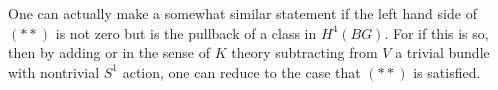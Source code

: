 One can actually make a somewhat similar statement if 
the left hand side of $(**)$ is not zero but is the pullback of
 a class in $H^4(BG)$.  For if this is so, then by adding or in the sense
 of $K$ theory subtracting from $V$ a trivial bundle with nontrivial
 $S^1$ action, one can reduce to the case that $(**)$ is satisfied.










